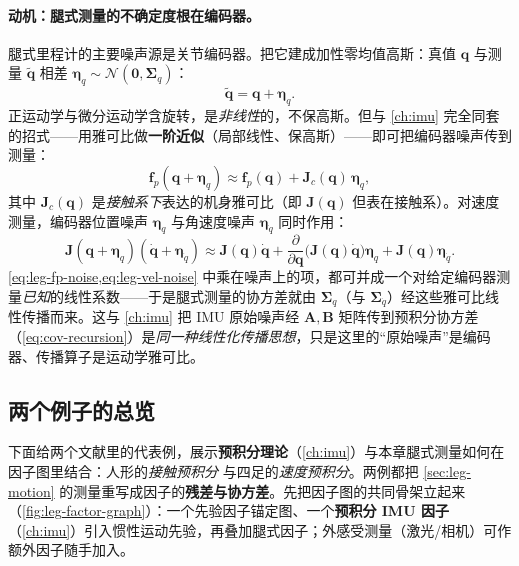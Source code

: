 \paragraph{动机：腿式测量的不确定度根在编码器。}
腿式里程计的主要噪声源是关节编码器。把它建成加性零均值高斯：真值 $\mathbf{q}$ 与测量 $\tilde{\mathbf{q}}$ 相差 $\boldsymbol{\eta}_q\sim\mathcal{N}(\mathbf{0},\boldsymbol{\Sigma}_q)$：
\begin{equation}
  \tilde{\mathbf{q}}=\mathbf{q}+\boldsymbol{\eta}_q.
  \label{eq:leg-encoder-noise}
\end{equation}
正运动学与微分运动学含旋转，是\emph{非线性}的，不保高斯。但与 \cref{ch:imu} 完全同套的招式——用雅可比做\textbf{一阶近似}（局部线性、保高斯）——即可把编码器噪声传到测量：
\begin{equation}
  \mathbf{f}_p(\mathbf{q}+\boldsymbol{\eta}_q)\approx\mathbf{f}_p(\mathbf{q})+\mathbf{J}_c(\mathbf{q})\,\boldsymbol{\eta}_q,
  \label{eq:leg-fp-noise}
\end{equation}
其中 $\mathbf{J}_c(\mathbf{q})$ 是\emph{接触系下}表达的机身雅可比（即 $\mathbf{J}(\mathbf{q})$ 但表在接触系）。对速度测量，编码器位置噪声 $\boldsymbol{\eta}_q$ 与角速度噪声 $\boldsymbol{\eta}_{\dot{q}}$ 同时作用\cite{wisth2023vilens}：
\begin{equation}
  \mathbf{J}(\mathbf{q}+\boldsymbol{\eta}_q)(\dot{\mathbf{q}}+\boldsymbol{\eta}_{\dot{q}})\approx\mathbf{J}(\mathbf{q})\dot{\mathbf{q}}+\frac{\partial}{\partial\mathbf{q}}\big(\mathbf{J}(\mathbf{q})\dot{\mathbf{q}}\big)\boldsymbol{\eta}_q+\mathbf{J}(\mathbf{q})\boldsymbol{\eta}_{\dot{q}}.
  \label{eq:leg-vel-noise}
\end{equation}
\cref{eq:leg-fp-noise,eq:leg-vel-noise} 中乘在噪声上的项，都可并成一个对给定编码器测量\emph{已知}的线性系数——于是腿式测量的协方差就由 $\boldsymbol{\Sigma}_q$（与 $\boldsymbol{\Sigma}_{\dot{q}}$）经这些雅可比线性传播而来。这与 \cref{ch:imu} 把 IMU 原始噪声经 $\mathbf{A},\mathbf{B}$ 矩阵传到预积分协方差（\cref{eq:cov-recursion}）是\emph{同一种线性化传播思想}，只是这里的“原始噪声”是编码器、传播算子是运动学雅可比。

\subsection{两个例子的总览}
\label{subsec:leg-two-examples}

下面给两个文献里的代表例，展示\textbf{预积分理论}（\cref{ch:imu}）与本章腿式测量如何在因子图里结合：人形的\emph{接触预积分}\cite{hartley2018legged} 与四足的\emph{速度预积分}\cite{wisth2023vilens}。两例都把 \cref{sec:leg-motion} 的测量重写成因子的\textbf{残差与协方差}。先把因子图的共同骨架立起来（\cref{fig:leg-factor-graph}）：一个先验因子锚定图、一个\textbf{预积分 IMU 因子}（\cref{ch:imu}）引入惯性运动先验，再叠加腿式因子；外感受测量（激光/相机）可作额外因子随手加入。

